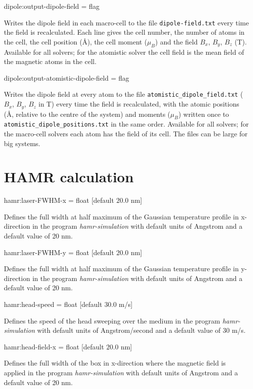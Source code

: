 {\zicf dipole:output-dipole-field = flag} Writes the dipole field in each macro-cell to the file \texttt{dipole-field.txt} every time the field is recalculated. Each line gives the cell number, the number of atoms in the cell, the cell position (\AA), the cell moment ($\mu_B$) and the field $B_x$, $B_y$, $B_z$ (T). Available for all solvers; for the atomistic solver the cell field is the mean field of the magnetic atoms in the cell.

{\zicf dipole:output-atomistic-dipole-field = flag} Writes the dipole field at every atom to the file \texttt{atomistic\_dipole\_field.txt} ($B_x$, $B_y$, $B_z$ in T) every time the field is recalculated, with the atomic positions (\AA, relative to the centre of the system) and moments ($\mu_B$) written once to \texttt{atomistic\_dipole\_positions.txt} in the same order. Available for all solvers; for the macro-cell solvers each atom has the field of its cell. The files can be large for big systems.

\section*{HAMR calculation}
{\zicf hamr:laser-FWHM-x = float [default $20.0$ nm]}
Defines the full width at half maximum of the Gaussian temperature profile in x-direction
in the program \textit{hamr-simulation} with default units of Angstrom and a default value of 20 nm.

{\zicf hamr:laser-FWHM-y = float [default $20.0$ nm]}
Defines the full width at half maximum of the Gaussian temperature profile in y-direction
in the program \textit{hamr-simulation} with default units of Angstrom and a default value of 20 nm.

{\zicf hamr:head-speed = float [default $30.0$ m/s]}
Defines the speed of the head sweeping over the medium
in the program \textit{hamr-simulation} with default units of Angstrom/second and a default value of 30 m/s.

{\zicf hamr:head-field-x = float [default $20.0$ nm]}
Defines the full width of the box in x-direction where the magnetic field is applied
in the program \textit{hamr-simulation} with default units of Angstrom and a default value of 20 nm.

